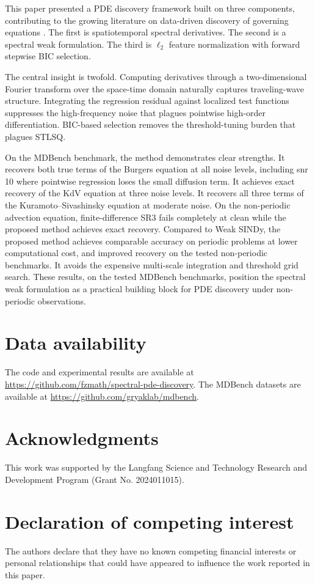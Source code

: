 \documentclass[preprint,12pt]{elsarticle}
\begin{document}
This paper presented a PDE discovery framework built on three components, contributing to the growing literature on data-driven discovery of governing equations \cite{brunton2024promising}. The first is spatiotemporal spectral derivatives. The second is a spectral weak formulation. The third is $\ell_2$ feature normalization with forward stepwise BIC selection.

The central insight is twofold. Computing derivatives through a two-dimensional Fourier transform over the space-time domain naturally captures traveling-wave structure. Integrating the regression residual against localized test functions suppresses the high-frequency noise that plagues pointwise high-order differentiation. BIC-based selection removes the threshold-tuning burden that plagues STLSQ.

On the MDBench benchmark, the method demonstrates clear strengths. It recovers both true terms of the Burgers equation at all noise levels, including snr 10 where pointwise regression loses the small diffusion term. It achieves exact recovery of the KdV equation at three noise levels. It recovers all three terms of the Kuramoto--Sivashinsky equation at moderate noise. On the non-periodic advection equation, finite-difference SR3 fails completely at clean while the proposed method achieves exact recovery. Compared to Weak SINDy, the proposed method achieves comparable accuracy on periodic problems at lower computational cost, and improved recovery on the tested non-periodic benchmarks. It avoids the expensive multi-scale integration and threshold grid search. These results, on the tested MDBench benchmarks, position the spectral weak formulation as a practical building block for PDE discovery under non-periodic observations.

\section*{Data availability}

The code and experimental results are available at \url{https://github.com/fzmath/spectral-pde-discovery}. The MDBench datasets are available at \url{https://github.com/gryaklab/mdbench}.

\section*{Acknowledgments}

This work was supported by the Langfang Science and Technology Research and Development Program (Grant No. 2024011015).

\section*{Declaration of competing interest}

The authors declare that they have no known competing financial interests or personal relationships that could have appeared to influence the work reported in this paper.



\end{document}

